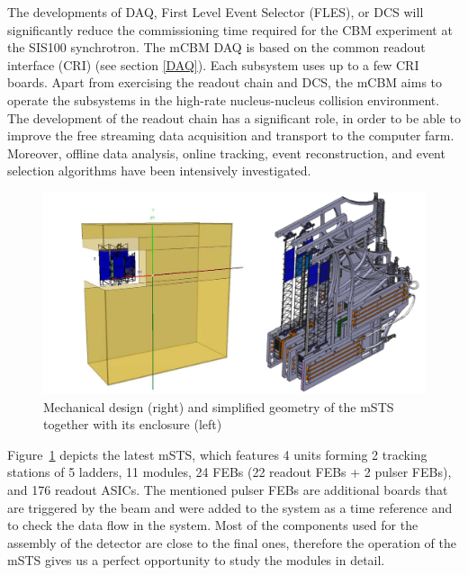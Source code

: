 The developments of DAQ, First Level Event Selector (\gls{FLES}), or \gls{DCS} will significantly reduce the commissioning time required for the CBM experiment at the SIS100 synchrotron. The mCBM \gls{DAQ} is based on the common readout interface (\gls{CRI}) (see section \ref{DAQ}). Each subsystem uses up to a few CRI boards. Apart from exercising the readout chain and DCS, the mCBM aims to operate the subsystems in the high-rate nucleus-nucleus collision environment. The development of the readout chain has a significant role, in order to be able to improve the free streaming data acquisition and transport to the computer farm. Moreover, offline data analysis, online tracking, event reconstruction, and event selection algorithms have been intensively investigated. 

\begin{figure}[!h]
\centering
\includegraphics[width=0.75\columnwidth]{Chapter5/DCS/images/mSTS_mech.png}
\caption{Mechanical design (right) and simplified geometry of the \gls{mSTS} together with its enclosure (left)}
\label{fig_STS}
\end{figure}

Figure~\ref{fig_STS} depicts the latest \gls{mSTS}, which features 4 units forming 2 tracking stations of 5 ladders, 11 modules, 24 \gls{FEB}s (22 readout \gls{FEB}s + 2 pulser \gls{FEB}s), and 176 readout \gls{ASIC}s. The mentioned pulser \gls{FEB}s are additional boards that are triggered by the beam and were added to the system as a time reference and to check the data flow in the system.  Most of the components used for the assembly of the detector are close to the final ones, therefore the operation of the \gls{mSTS} gives us a perfect opportunity to study the modules in detail.
